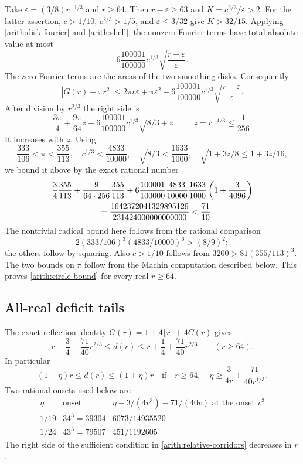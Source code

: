 \documentclass[11pt,reqno]{amsart}
\numberwithin{equation}{section}
\begin{document}
Take $\varepsilon=(3/8)r^{-1/3}$ and $r\ge64$.  Then
$r-\varepsilon\ge63$ and $K=c^{2/3}/\varepsilon>2$.
For the latter assertion, $c>1/10$, $c^{2/3}>1/5$, and
$\varepsilon\le3/32$ give $K>32/15$.
Applying \eqref{arith:disk-fourier} and \eqref{arith:shell}, the
nonzero Fourier terms have total absolute value at most
\[
 6\frac{100001}{100000}c^{1/3}
          \sqrt{\frac{r+\varepsilon}{\varepsilon}}.
\]
The zero Fourier terms are the areas of the two smoothing disks.
Consequently
\[
 |G(r)-\pi r^2|\le2\pi r\varepsilon+\pi\varepsilon^2+
 6\frac{100001}{100000}c^{1/3}
          \sqrt{\frac{r+\varepsilon}{\varepsilon}}.
\]
After division by $r^{2/3}$ the right side is
\[
 \frac{3\pi}{4}+\frac{9\pi}{64}z+
 6\frac{100001}{100000}c^{1/3}\sqrt{8/3+z},
 \qquad z=r^{-4/3}\le\frac1{256}.
\]
It increases with $z$.  Using
\[
 \frac{333}{106}<\pi<\frac{355}{113},\quad
 c^{1/3}<\frac{4833}{10000},\quad
 \sqrt{8/3}<\frac{1633}{1000},\quad
 \sqrt{1+3z/8}\le1+3z/16,
\]
we bound it above by the exact rational number
\begin{align*}
 &\frac34\frac{355}{113}
 +\frac9{64\cdot256}\frac{355}{113}
 +6\frac{100001}{100000}\frac{4833}{10000}
       \frac{1633}{1000}\left(1+\frac3{4096}\right)\\
 &\hspace{20mm}=
 \frac{1642372041329895129}{231424000000000000}
 <\frac{71}{10}.
\end{align*}
The nontrivial radical bound here follows from the rational comparison
\[2(333/106)^3(4833/10000)^6>(8/9)^2;\]
the others follow by squaring.
Also $c>1/10$ follows from $3200>81(355/113)^3$.
The two bounds on $\pi$ follow from the Machin computation described
below.  This proves \eqref{arith:circle-bound} for every real $r\ge64$.

\subsection{All-real deficit tails}

The exact reflection identity $G(r)=1+4\lfloor r\rfloor+4C(r)$ gives
\begin{equation}\label{arith:deficit-error}
 r-\frac34-\frac{71}{40}r^{2/3}
 \le d(r)\le
 r+\frac14+\frac{71}{40}r^{2/3}\qquad(r\ge64).
\end{equation}
In particular
\begin{equation}\label{arith:relative-corridors}
 (1-\eta)r\le d(r)\le(1+\eta)r
 \quad\text{if}\quad
 r\ge64,\quad \eta\ge\frac3{4r}+\frac{71}{40r^{1/3}}.
\end{equation}
Two rational onsets used below are
\[
 \begin{array}{c|c|c}
 \eta&\text{onset}&
 \eta-3/(4v^3)-71/(40v)\text{ at the onset }v^3\\ \hline
 1/19&34^3=39304&6073/14935520\\
 1/24&43^3=79507&451/1192605
 \end{array}
\]
The right side of the sufficient condition in
\eqref{arith:relative-corridors} decreases in $r$.
\end{document}
